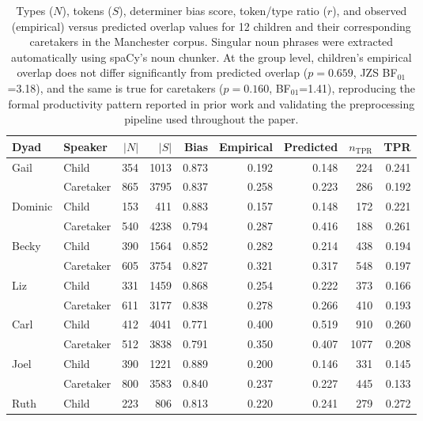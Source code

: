 \begin{table}[]
\centering
\small
\caption{Types (\(N\)), tokens (\(S\)), determiner bias score, token/type ratio (\(r\)), and observed (empirical) versus predicted overlap values for 12 children and their corresponding caretakers in the Manchester corpus. Singular noun phrases were extracted automatically using spaCy's noun chunker. At the group level, children's empirical overlap does not differ significantly from predicted overlap (\(p=0.659\), JZS BF\(_{01}\)=3.18), and the same is true for caretakers (\(p=0.160\), BF\(_{01}\)=1.41), reproducing the formal productivity pattern reported in prior work and validating the preprocessing pipeline used throughout the paper.}
\label{tab:manchester-validation}
\begin{tabular}{llrrrrrrr}
\toprule
Dyad & Speaker & $|N|$ & $|S|$ & Bias & Empirical & Predicted & $n_\text{TPR}$ & TPR \\
\midrule
\multirow{2}{*}{Gail} & Child & 354 & 1013 & 0.873 & 0.192 & 0.148 & 224 & 0.241 \\
                          & Caretaker & 865 & 3795 & 0.837 & 0.258 & 0.223 & 286 & 0.192 \\
\multirow{2}{*}{Dominic} & Child & 153 & 411 & 0.883 & 0.157 & 0.148 & 172 & 0.221 \\
                          & Caretaker & 540 & 4238 & 0.794 & 0.287 & 0.416 & 188 & 0.261 \\
\multirow{2}{*}{Becky} & Child & 390 & 1564 & 0.852 & 0.282 & 0.214 & 438 & 0.194 \\
                          & Caretaker & 605 & 3754 & 0.827 & 0.321 & 0.317 & 548 & 0.197 \\
\multirow{2}{*}{Liz} & Child & 331 & 1459 & 0.868 & 0.254 & 0.222 & 373 & 0.166 \\
                          & Caretaker & 611 & 3177 & 0.838 & 0.278 & 0.266 & 410 & 0.193 \\
\multirow{2}{*}{Carl} & Child & 412 & 4041 & 0.771 & 0.400 & 0.519 & 910 & 0.260 \\
                          & Caretaker & 512 & 3838 & 0.791 & 0.350 & 0.407 & 1077 & 0.208 \\
\multirow{2}{*}{Joel} & Child & 390 & 1221 & 0.889 & 0.200 & 0.146 & 331 & 0.145 \\
                          & Caretaker & 800 & 3583 & 0.840 & 0.237 & 0.227 & 445 & 0.133 \\
\multirow{2}{*}{Ruth} & Child & 223 & 806 & 0.813 & 0.220 & 0.241 & 279 & 0.272 \\

\end{tabular}
\end{table}
